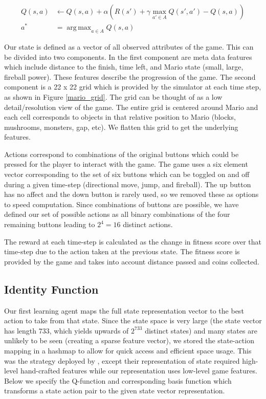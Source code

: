 \documentclass[12pt]{article}
\DeclareMathOperator*{\argmax}{arg\,max}
\begin{document}
\begin{align*}
Q(s,a) &\leftarrow Q(s,a) + \alpha (R(s') + \gamma \max_{a' \in A} Q(s',a') - Q(s,a))\\
a^* &= \argmax_{a \in A} Q(s,a)
\end{align*}

Our state is defined as a vector of all observed attributes of the game. This can be divided into two components. In the first component are meta data features which include distance to the finish, time left, and Mario state (small, large, fireball power). These features describe the progression of the game. The second component is a 22 x 22 grid which is provided by the simulator at each time step, as shown in Figure \ref{mario_grid}. The grid can be thought of as a low detail/resolution view of the game. The entire grid is centered around Mario and each cell corresponds to objects in that relative position to Mario (blocks, mushrooms, monsters, gap, etc). We flatten this grid to get the underlying features.

Actions correspond to combinations of the original buttons which could be pressed for the player to interact with the game. The game uses a six element vector corresponding to the set of six buttons which can be toggled on and off during a given time-step (directional move, jump, and fireball). The up button has no affect and the down button is rarely used, so we removed these as options to speed computation. Since combinations of buttons are possible, we have defined our set of possible actions as all binary combinations of the four remaining buttons leading to $2^4 = 16$ distinct actions.

The reward at each time-step is calculated as the change in fitness score over that time-step due to the action taken at the previous state. The fitness score is provided by the game and takes into account distance passed and coins collected.

\subsection{Identity Function}

Our first learning agent maps the full state representation vector to the best action to take from that state. Since the state space is very large (the state vector has length $733$, which yields upwards of $2^{733}$ distinct states) and many states are unlikely to be seen (creating a sparse feature vector), we stored the state-action mapping in a hashmap to allow for quick access and efficient space usage. This was the strategy deployed by \cite{liao2012cs229}, except their representation of state required high-level hand-crafted features while our representation uses low-level game features. Below we specify the Q-function and corresponding basis function which transforms a state action pair to the given state vector representation.
\end{document}
